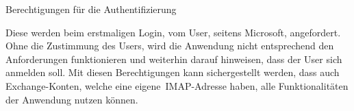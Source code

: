     \caption{Berechtigungen für die Authentifizierung}\label{tab:Berechtigungen für die Authentifizierung}
\newline
\newline
\raggedright
\normalsize
Diese werden beim erstmaligen Login, vom User, seitens Microsoft, angefordert.
Ohne die Zustimmung des Users, wird die Anwendung nicht entsprechend den Anforderungen funktionieren und weiterhin darauf hinweisen, dass der User sich anmelden soll.
Mit diesen Berechtigungen kann sichergestellt werden, dass auch Exchange-Konten, welche eine eigene~\gls{IMAP}-Adresse haben, alle Funktionalitäten der Anwendung nutzen können.